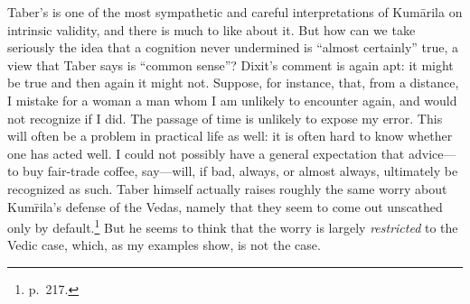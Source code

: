 \documentclass[11pt,letterpaper,oneside]{amsart}
\newcommand{\e}{\emph}
\newenvironment{squote}{\begin{quote}\sf\small}{\rm\end{quote}} %
\newcommand{\kum}{Kum\={a}rila}
\newcommand{\svapra}{\e{svata\d{h} pr\={a}m\={a}\d{n}ya}}
\begin{document}

Taber's is one of the most sympathetic and careful interpretations of Kum\=arila on intrinsic validity, and there is much to like about it. But how can we take seriously the idea that a cognition never undermined is ``almost certainly'' true, a view that Taber says is ``common sense''? Dixit's comment is again apt: it might be true and then again it might not. Suppose, for instance, that, from a distance, I mistake for a woman a man whom I am unlikely to encounter again, and would not recognize if I did. The passage of time is unlikely to expose my error. This will often be a problem in practical life as well: it is often hard to know whether one has acted well. I could not possibly have a general expectation that advice---to buy fair-trade coffee, say---will, if bad, always, or almost always, ultimately be recognized as such. Taber himself actually raises roughly the same worry about Kum\=rila's defense of the Vedas, namely that they seem to come out unscathed only by default.\footnote{p.\ 217.} But he seems to think that the worry is largely \e{restricted} to the Vedic case, which, as my examples show, is not the case.%
\end{document}
